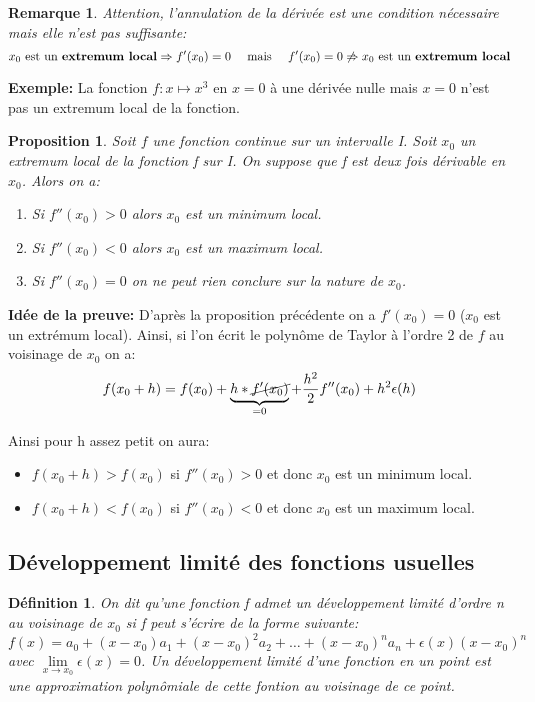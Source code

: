 \documentclass[a4paper]{article}
\theoremstyle{break}
\newtheorem{mydef}{Définition}[section]
\newtheorem*{Rem}{Remarque}
\newtheorem{prop}{Proposition}[section]
\begin{document}
\begin{Rem}
Attention, l'annulation de la dérivée est une condition nécessaire
mais elle n'est pas suffisante:
\[
  x_0 \text{ est un \textbf{extremum local}} \Rightarrow f'(x_0) = 0
  \quad \text{ mais } \quad
  f'(x_0) = 0 \not \Rightarrow x_0 \text{ est un \textbf{extremum local}}
\]
\end{Rem}

\textbf{Exemple: } La fonction $f: x \mapsto x^3$ en $x=0$ à une dérivée
nulle mais $x=0$ n'est pas un extremum local de la fonction.  

\begin{prop}
  Soit $f$ une fonction continue sur un intervalle I. Soit $x_0$ un
  extremum local de la fonction f sur I. On suppose que f est deux
  fois dérivable en $x_0$. Alors on a:
  \begin{enumerate}[label=(\alph*), leftmargin=2cm]
  \item Si $f''(x_0) > 0$ alors $x_0$ est un minimum local.
  \item Si $f''(x_0) < 0$ alors $x_0$ est un maximum local.
  \item Si $f''(x_0) = 0$ on ne peut rien conclure sur la nature de
    $x_0$.
  \end{enumerate}
\end{prop}

\textbf{Idée de la preuve: } D'après la proposition précédente on a
$f'(x_0) = 0$ ($x_0$ est un extrémum local). Ainsi, si l'on écrit le
polynôme de Taylor à l'ordre 2 de $f$ au voisinage de $x_0$ on a:
\[
  f(x_0+h) = f(x_0) + \underbrace{h * \cancel{f'(x_0)}}_{=0} +
  \frac{h^2}{2} f''(x_0) + h^2 \epsilon (h)
\]

Ainsi pour \og h assez petit\fg{} on aura:
\begin{itemize}[label=$\bullet$, leftmargin=2cm]
\item $f(x_0+h) > f(x_0)$ si $f''(x_0) >0$ et donc $x_0$ est un minimum
  local.
\item $f(x_0+h) < f(x_0)$ si $f''(x_0) <0$ et donc $x_0$ est un maximum
  local.
\end{itemize}

\subsection{Développement limité des fonctions usuelles}
\begin{mydef}
  On dit qu'une fonction f admet un développement limité d'ordre n au
  voisinage de $x_0$ si f peut s'écrire de la forme suivante:
  \[
    f(x) = a_0 + (x-x_0) a_1 + (x-x_0)^2  a_2 + \dots +
    (x-x_0)^n a_n + \epsilon(x)(x-x_0)^n 
  \]
  avec $\lim \limits_{x \to x_0} \epsilon(x) = 0$. Un développement
  limité d'une fonction en un point est une approximation polynômiale
  de cette fontion au voisinage de ce point. 
\end{mydef}
\end{document}
